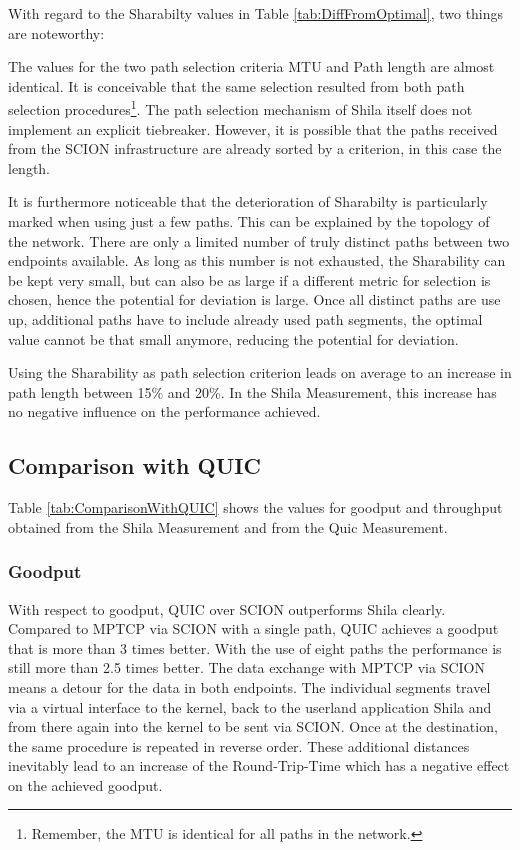 With regard to the Sharabilty values in Table \ref{tab:DiffFromOptimal}, two things are noteworthy:

The values for the two path selection criteria MTU and Path length are almost identical. It is conceivable that the same selection resulted from both path selection procedures\footnote{Remember, the MTU is identical for all paths in the network.}. The path selection mechanism of Shila itself does not implement an explicit tiebreaker. However, it is possible that the paths received from the SCION infrastructure are already sorted by a criterion, in this case the length.

It is furthermore noticeable that the deterioration of Sharabilty is particularly marked when using just a few paths. This can be explained by the topology of the network. There are only a limited number of truly distinct paths between two endpoints available. As long as this number is not exhausted, the Sharability can be kept very small, but can also be as large if a different metric for selection is chosen, hence the potential for deviation is large. Once all distinct paths are use up, additional paths have to include already used path segments, the optimal value cannot be that small anymore, reducing the potential for deviation.

Using the Sharability as path selection criterion leads on average to an increase in path length between 15\% and 20\%. In the Shila Measurement, this increase has no negative influence on the performance achieved. 

\subsection*{Comparison with QUIC}
\label{subsec:ComparisonWithQUIC}

Table \ref{tab:ComparisonWithQUIC} shows the values for goodput and throughput obtained from the Shila Measurement and from the Quic Measurement. 

\subsubsection{Goodput}

With respect to goodput, QUIC over SCION outperforms Shila clearly. Compared to MPTCP via SCION with a single path, QUIC achieves a goodput that is more than 3 times better. With the use of eight paths the performance is still more than 2.5 times better. The data exchange with MPTCP via SCION means a detour for the data in both endpoints. The individual segments travel via a virtual interface to the kernel, back to the userland application Shila and from there again into the kernel to be sent via SCION. Once at the destination, the same procedure is repeated in reverse order. These additional distances inevitably lead to an increase of the Round-Trip-Time which has a negative effect on the achieved goodput.

